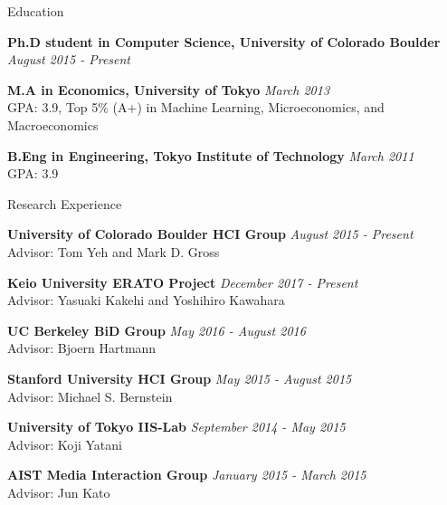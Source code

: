 \documentclass{resume} %
\begin{document}
\begin{rSection}{Education}

{\bf Ph.D student in Computer Science, University of Colorado Boulder} \hfill {\em August 2015 - Present} 

{\bf M.A in Economics, University of Tokyo} \hfill {\em March 2013} \\
GPA: 3.9, Top 5\% (A+) in Machine Learning, Microeconomics, and Macroeconomics

{\bf B.Eng in Engineering, Tokyo Institute of Technology} \hfill {\em March 2011} \\ 
GPA: 3.9

\end{rSection}



\begin{rSection}{Research Experience}

{\bf University of Colorado Boulder HCI Group} \hfill {\em August 2015 - Present} \\
Advisor: Tom Yeh and Mark D. Gross

{\bf Keio University ERATO Project} \hfill {\em December 2017 - Present} \\
Advisor: Yasuaki Kakehi and Yoshihiro Kawahara

{\bf UC Berkeley BiD Group} \hfill {\em May 2016 - August 2016} \\
Advisor: Bjoern Hartmann

{\bf Stanford University HCI Group} \hfill {\em May 2015 - August 2015} \\
Advisor: Michael S. Bernstein

{\bf University of Tokyo IIS-Lab} \hfill {\em September 2014 - May 2015} \\
Advisor: Koji Yatani

{\bf AIST Media Interaction Group} \hfill {\em January 2015 - March 2015} \\
Advisor: Jun Kato

\end{rSection}
\end{document}
